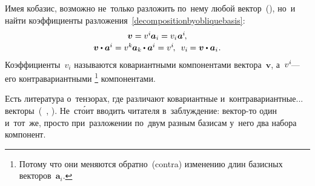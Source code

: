 \begin{otherlanguage}{russian}
\begin{tcolorbox}
\par\end{tcolorbox}

Имея кобазис, возможно не~только разложить по~нему любой вектор~(), но~и найти коэффициенты разложения~\eqref{decompositionbyobliquebasis}:
\begin{equation}\begin{array}{c}
\bm{v} = v^{i} \hspace{-0.1ex} \bm{a}_i = v_{i} \hspace{0.1ex} \bm{a}^{\hspace{-0.05ex}i} \hspace{-0.25ex}, \\[0.16em]
\bm{v} \dotp \bm{a}^{\hspace{-0.05ex}i} = v^{k} \hspace{-0.1ex} \bm{a}_k \hspace{-0.1ex} \dotp \bm{a}^{\hspace{-0.05ex}i} = v^{i} \hspace{-0.25ex}, \:\;
v_{i} \hspace{-0.1ex} = \bm{v} \dotp \bm{a}_i \hspace{0.1ex}.
\end{array}\end{equation}
\noindent Коэффициенты~${v_i}$ называются ко\-вариант\-ными компонентами вектора~$\bm{v}$, а~${v^i \hspace{-0.25ex}}$\:--- его контра\-вариант\-ными%
\footnote{Потому что они меняются обратно~(contra) изменению длин базисных векторов~${\bm{a}_i}$.}\hspace{-0.2ex}
компонентами.

Есть литература о~тензорах, где различают ко\-вариант\-ные и~контра\-вариант\-ные... векторы~(~, ). Не~ст\'{о}ит вводить читателя в~заблуждение: вектор\hbox{-}то один и~тот~же, просто при~разложении по~двум разным базисам у~него два набора компонент.




\end{otherlanguage}
